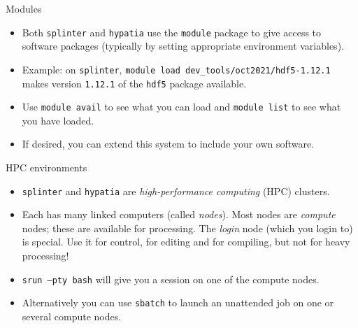 \documentclass[dvipsnames]{beamer}
\newcommand{\command}[1]{\colorbox{light-gray}{\texttt{#1}}}
\newcommand{\server}[1]{\textcolor{BrickRed}{\texttt{#1}}}
\begin{document}
\begin{frame}{Modules}
\begin{itemize}
\item Both \server{splinter} and \server{hypatia} use the \command{module} package to give access to software packages (typically by setting appropriate environment variables).
\item Example: on \server{splinter}, \command{module load dev\_tools/oct2021/hdf5-1.12.1} makes version \texttt{1.12.1} of the \command{hdf5} package available.
\item Use \command{module avail} to see what you can load and \command{module list} to see what you have loaded.
\item If desired, you can extend this system to include your own software.
\end{itemize}
\end{frame}


\begin{frame}{HPC environments}
\begin{itemize}
\item \server{splinter} and \server{hypatia} are \textit{high-performance computing} (HPC) clusters.
\item Each has many linked computers (called \textit{nodes}). Most nodes are \textit{compute} nodes; these are available for processing. The \textit{login} node (which you login to) is special. Use it for control, for editing and for compiling, but not for heavy processing!
\item \command{srun --pty bash} will give you a session on one of the compute nodes.
\item Alternatively you can use \command{sbatch} to launch an unattended job on one or several compute nodes.
\end{itemize}
\end{frame}
\end{document}
